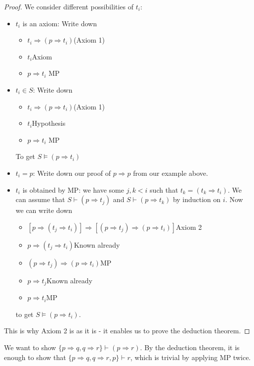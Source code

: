 \documentclass[a4paper]{article}
\begin{document}
\begin{proof}
  We consider different possibilities of $t_i$:
  \begin{itemize}
    \item $t_i$ is an axiom: Write down
      \begin{itemize}
        \item $t_i\Rightarrow (p\Rightarrow t_i)$\hfill (Axiom 1)
        \item $t_i$\hfill Axiom
        \item $p\Rightarrow t_i$ \hfill MP
      \end{itemize}
    \item $t_i\in S$: Write down
      \begin{itemize}
        \item $t_i\Rightarrow (p\Rightarrow t_i)$\hfill (Axiom 1)
        \item $t_i$\hfill Hypothesis
        \item $p\Rightarrow t_i$ \hfill MP
      \end{itemize}
      To get $S\models (p\Rightarrow t_i)$
    \item $t_i = p$: Write down our proof of $p\Rightarrow p$ from our example above.
    \item $t_i$ is obtained by MP: we have some $j, k< i$ such that $t_k = (t_k\Rightarrow t_i)$. We can assume that $S\vdash (p\Rightarrow t_j)$ and $S\vdash (p\Rightarrow t_k)$ by induction on $i$. Now we can write down
      \begin{itemize}
        \item $[p\Rightarrow (t_j\Rightarrow t_i)]\Rightarrow [(p\Rightarrow t_j)\Rightarrow (p\Rightarrow t_i)]$\hfill Axiom 2
        \item $p\Rightarrow (t_j\Rightarrow t_i)$\hfill Known already
        \item $(p\Rightarrow t_j)\Rightarrow (p\Rightarrow t_i)$\hfill MP
        \item $p\Rightarrow t_j$\hfill Known already
        \item $p\Rightarrow t_i$\hfill MP
      \end{itemize}
      to get $S\models (p\Rightarrow t_i)$. 
  \end{itemize}
  This is why Axiom 2 is as it is - it enables us to prove the deduction theorem. 
\end{proof}

\begin{eg}
  We want to show $\{p\Rightarrow  q, q\Rightarrow r\} \vdash (p\Rightarrow r)$. By the deduction theorem, it is enough to show that $\{p\Rightarrow q, q\Rightarrow  r, p\}\vdash r$, which is trivial by applying MP twice. 
\end{eg}
\end{document}
